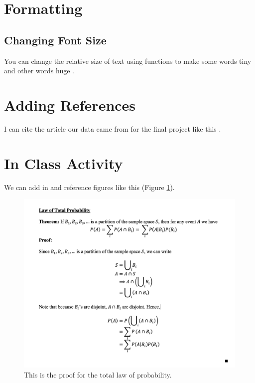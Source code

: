 \documentclass[12pt]{article}
\begin{document}
\section{Formatting}
\subsection{Changing Font Size}
You can change the relative size of text using functions to make some words \tiny{} tiny \normalsize{} and other words \huge{} huge \normalsize{}.


\section{Adding References}

I can cite the article our data came from for the final project like this \cite{Overmyer2021}.

\newpage
\section{In Class Activity}

We can add in and reference figures like this (Figure \ref{fig:Prob}).

\begin{figure}[h]
    \centering
    \includegraphics[width = \textwidth]{TotalLawProbability.png}
    \caption{This is the proof for the total law of probability.}
    \label{fig:Prob}
\end{figure}

%



\end{document}

